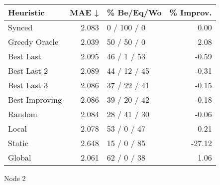 \begin{tabular}{lrlr}
\toprule
\textbf{Heuristic} & \textbf{MAE ↓} & \textbf{\% Be/Eq/Wo} & \textbf{\% Improv.} \\
\midrule
            Synced &          2.083 &          0 / 100 / 0 &                0.00 \\
     Greedy Oracle &          2.039 &          50 / 50 / 0 &                2.08 \\
         Best Last &          2.095 &          46 / 1 / 53 &               -0.59 \\
       Best Last 2 &          2.089 &         44 / 12 / 45 &               -0.31 \\
       Best Last 3 &          2.086 &         37 / 22 / 41 &               -0.15 \\
    Best Improving &          2.086 &         39 / 20 / 42 &               -0.18 \\
            Random &          2.084 &         28 / 41 / 30 &               -0.06 \\
             Local &          2.078 &          53 / 0 / 47 &                0.21 \\
            Static &          2.648 &          15 / 0 / 85 &              -27.12 \\
            Global &          2.061 &          62 / 0 / 38 &                1.06 \\
\bottomrule
\end{tabular}
\caption{Node 2}
\label{tab:hr_non_lr01_le2_bs4_2}
